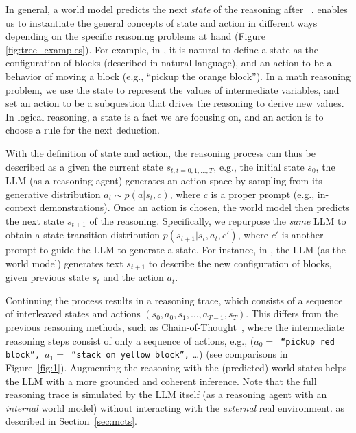 In general, a world model predicts the next \emph{state} of the reasoning after ~\cite{ha2018world, matsuo2022deep}. \ours enables us to instantiate the general concepts of state and action in different ways depending on the specific reasoning problems at hand (Figure \ref{fig:tree_examples}). For example, in \blocksworld, it is natural to define a state as the configuration of blocks (described in natural language), and an action to be a behavior of moving a block (e.g., ``pickup the orange block''). In a math reasoning problem, we use the state to represent the values of intermediate variables, and set an action to be a subquestion that drives the reasoning to derive new values. In logical reasoning, a state is a fact we are focusing on, and an action is to choose a rule for the next deduction.


With the definition of state and action, the reasoning process can thus be described as a  given the current state $s_{t, t=0, 1, \dots, T}$, e.g., the initial state $s_0$, the LLM (as a reasoning agent) generates an action space by sampling from its generative distribution $a_t \sim p(a | s_t, c)$, where $c$ is a proper prompt (e.g., in-context demonstrations). Once an action is chosen, the world model then predicts the next state $s_{t+1}$ of the reasoning. Specifically, we repurpose the \emph{same} LLM to obtain a state transition distribution $p(s_{t+1} | s_t, a_t, c')$, where $c'$ is another prompt to guide the LLM to generate a state. For instance, in \blocksworld, the LLM (as the world model) generates text $s_{t+1}$ to describe the new configuration of blocks, given previous state $s_{t}$ and the action $a_t$.

Continuing the process results in a reasoning trace, which consists of a sequence of interleaved states and actions $(s_0, a_0, s_1, \dots, a_{T-1}, s_T)$. This differs from the previous reasoning methods, such as Chain-of-Thought~\cite{wei2022chain}, where the intermediate reasoning steps consist of only a sequence of actions, e.g., (\texttt{$a_0=$ ``pickup red block'', $a_1=$ ``stack on yellow block'',} \dots) (see comparisons in Figure~\ref{fig:1}). Augmenting the reasoning with the (predicted) world states helps the LLM with a more grounded and coherent inference. Note that the full reasoning trace is simulated by the LLM itself (as a reasoning agent with an \emph{internal} world model) without interacting with the \emph{external} real environment.  as described in Section~\ref{sec:mcts}.


